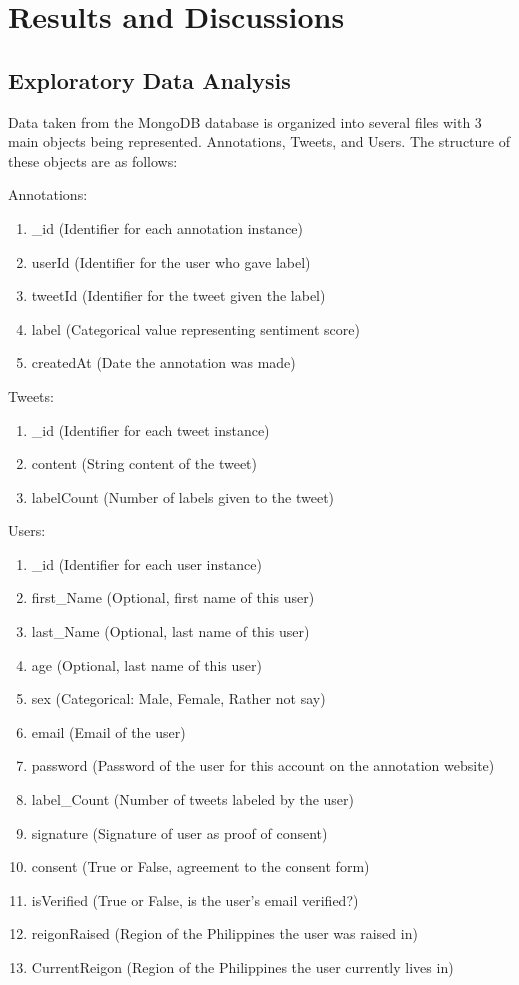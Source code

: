 \chapter{Results and Discussions}

\section{Exploratory Data Analysis}

Data taken from the MongoDB database is organized into several files with 3 main objects being represented. Annotations, Tweets, and Users. The structure of these objects are as follows:

Annotations:

\begin{enumerate}
	\item \_id (Identifier for each annotation instance)
	\item userId (Identifier for the user who gave label)
	\item tweetId (Identifier for the tweet given the label)
	\item label (Categorical value representing sentiment score)
	\item createdAt (Date the annotation was made)
\end{enumerate}

Tweets:

\begin{enumerate}
	\item \_id (Identifier for each tweet instance)
	\item content (String content of the tweet)
	\item labelCount (Number of labels given to the tweet)
\end{enumerate}

Users:

\begin{enumerate}
	\item \_id (Identifier for each user instance)
	\item first\_Name (Optional, first name of this user)
	\item last\_Name (Optional, last name of this user)
	\item age (Optional, last name of this user)
	\item sex (Categorical: Male, Female, Rather not say)
	\item email (Email of the user)
	\item password (Password of the user for this account on the annotation website)
	\item label\_Count (Number of tweets labeled by the user)
	\item signature (Signature of user as proof of consent)
	\item consent (True or False, agreement to the consent form)
	\item isVerified (True or False, is the user's email verified?)
	\item reigonRaised (Region of the Philippines the user was raised in)
	\item CurrentReigon (Region of the Philippines the user currently lives in)
	
\end{enumerate}

